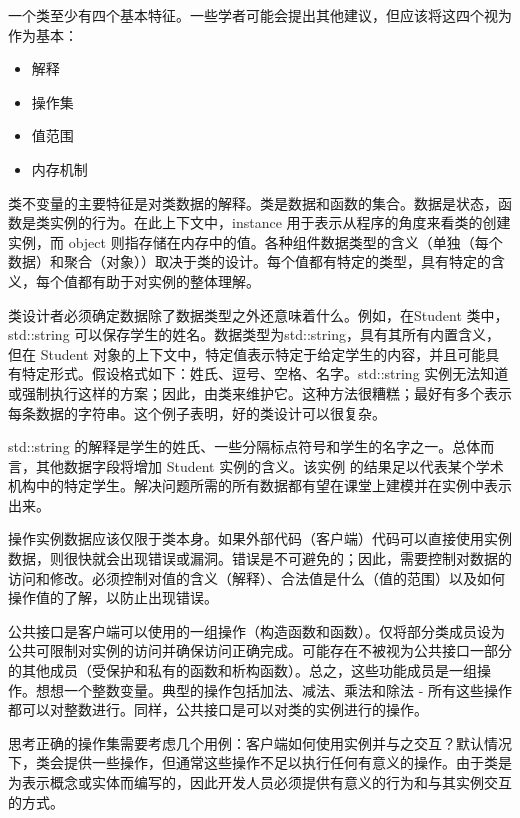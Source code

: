 
一个类至少有四个基本特征。一些学者可能会提出其他建议，但应该将这四个视为作为基本：

\begin{itemize}
\item
解释

\item
操作集

\item
值范围

\item
内存机制
\end{itemize}


类不变量的主要特征是对类数据的解释。类是数据和函数的集合。数据是状态，函数是类实例的行为。在此上下文中，instance 用于表示从程序的角度来看类的创建实例，而 object 则指存储在内存中的值。各种组件数据类型的含义（单独（每个数据）和聚合（对象））取决于类的设计。每个值都有特定的类型，具有特定的含义，每个值都有助于对实例的整体理解。

类设计者必须确定数据除了数据类型之外还意味着什么。例如，在Student 类中，std::string 可以保存学生的姓名。数据类型为std::string，具有其所有内置含义，但在 Student 对象的上下文中，特定值表示特定于给定学生的内容，并且可能具有特定形式。假设格式如下：姓氏、逗号、空格、名字。std::string 实例无法知道或强制执行这样的方案；因此，由类来维护它。这种方法很糟糕；最好有多个表示每条数据的字符串。这个例子表明，好的类设计可以很复杂。

std::string 的解释是学生的姓氏、一些分隔标点符号和学生的名字之一。总体而言，其他数据字段将增加 Student 实例的含义。该实例 的结果足以代表某个学术机构中的特定学生。解决问题所需的所有数据都有望在课堂上建模并在实例中表示出来。


操作实例数据应该仅限于类本身。如果外部代码（客户端）代码可以直接使用实例数据，则很快就会出现错误或漏洞。错误是不可避免的；因此，需要控制对数据的访问和修改。必须控制对值的含义（解释）、合法值是什么（值的范围）以及如何操作值的了解，以防止出现错误。

公共接口是客户端可以使用的一组操作（构造函数和函数）。仅将部分类成员设为公共可限制对实例的访问并确保访问正确完成。可能存在不被视为公共接口一部分的其他成员（受保护和私有的函数和析构函数）。总之，这些功能成员是一组操作。想想一个整数变量。典型的操作包括加法、减法、乘法和除法 - 所有这些操作都可以对整数进行。同样，公共接口是可以对类的实例进行的操作。

思考正确的操作集需要考虑几个用例：客户端如何使用实例并与之交互？默认情况下，类会提供一些操作，但通常这些操作不足以执行任何有意义的操作。由于类是为表示概念或实体而编写的，因此开发人员必须提供有意义的行为和与其实例交互的方式。

